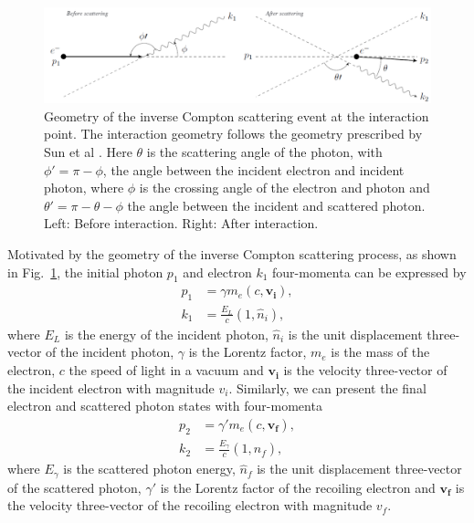 \documentclass[../main.tex]{subfiles}
\begin{document}
\begin{figure}[!h]
\centering
\includegraphics[width=\textwidth]{Figures/Photon_Production_by_Inverse_Compton_Scattering/scatteringkinematicsdiagram.pdf}
\caption{Geometry of the inverse Compton scattering event at the interaction point. The interaction geometry follows the geometry prescribed by Sun et al \cite{sun2009energy}. Here $\theta$ is the scattering angle of the photon, with $\phi' = \pi -\phi$, the angle between the incident electron and incident photon, where $\phi$ is the crossing angle of the electron and photon and $\theta' = \pi - \theta - \phi$ the angle between the incident and scattered photon. Left: Before interaction. Right: After interaction.}
\label{fig:scattered_photon_kinematics}
\end{figure}

Motivated by the geometry of the inverse Compton scattering process, as shown in Fig.~\ref{fig:scattered_photon_kinematics}, the initial photon $p_{1}$ and electron $k_{1}$ four-momenta can be expressed by
\begin{align}
p_{1} &= \gamma m_{e}\left(c,\boldsymbol{v_{i}}\right),
\label{eq:initial_four_vectors} \\
k_{1} &= \frac{E_{L}}{c}\left(1,\hat{n}_{i}\right), 
\end{align}
where $E_{L}$ is the energy of the incident photon, $\hat{n}_{i}$ is the unit displacement three-vector of the incident photon, $\gamma$ is the Lorentz factor, $m_{e}$ is the mass of the electron, $c$ the speed of light in a vacuum and $\boldsymbol{v_{i}}$ is the velocity three-vector of the incident electron with magnitude $v_{i}$. Similarly, we can present the final electron and scattered photon states with four-momenta
\begin{align}
p_{2} &= \gamma' m_{e}\left(c,\boldsymbol{v_{f}}\right), \\
k_{2} &= \frac{E_{\gamma}}{c}\left(1,\hat{n}_{f}\right), 
\label{eq:final_four_vectors} 
\end{align}
where $E_{\gamma}$ is the scattered photon energy, $\hat{n}_{f}$ is the unit displacement three-vector of the scattered photon, $\gamma'$ is the Lorentz factor of the recoiling electron and $\boldsymbol{v_{f}}$ is the velocity three-vector of the recoiling electron with magnitude $v_{f}$.
\end{document}
